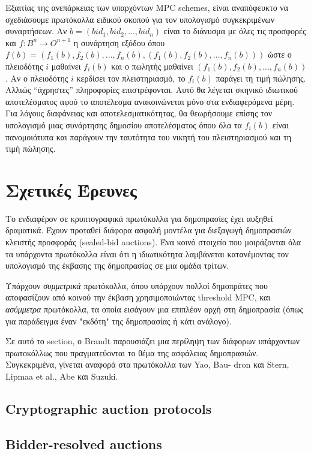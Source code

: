 \documentclass[letterpaper,11pt]{article}
\begin{document}
Εξαιτίας της ανεπάρκειας των υπαρχόντων MPC schemes, είναι αναπόφευκτο να σχεδιάσουμε πρωτόκολλα ειδικού
σκοπού για τον υπολογισμό συγκεκριμένων συναρτήσεων. Αν $b = (bid_1, bid_2, ..., bid_n)$ είναι το διάνυσμα με
όλες τις προσφορές και $f: B^n \rightarrow O^{n+1}$ η συνάρτηση εξόδου όπου $f(b) = (f_1(b), f_2(b), ...,
f_n(b),(f_1(b), f_2(b), ...,f_n(b)))$ ώστε ο πλειοδότης $i$ μαθαίνει $f_i(b)$ και ο πωλητής μαθαίνει $(f_1(b),
f_2(b), ..., f_n(b))$. Αν ο πλειοδότης $i$ κερδίσει τον πλειστηριασμό, το $f_i(b)$ παράγει τη τιμή πώλησης.
Αλλιώς “άχρηστες” πληροφορίες επιστρέφονται. Αυτό θα λέγεται σκηνικό ιδιωτικού αποτελέσματος αφού το
αποτέλεσμα ανακοινώνεται μόνο στα ενδιαφερόμενα μέρη. Για λόγους διαφάνειας και αποτελεσματικότητας, θα
θεωρήσουμε επίσης τον υπολογισμό μιας συνάρτησης δημοσίου αποτελέσματος όπου όλα τα $f_i(b)$ είναι
πανομοιότυπα και παράγουν την ταυτότητα του νικητή του πλειστηριασμού και τη τιμή πώλησης.

\section{Σχετικές Έρευνες} Το ενδιαφέρον σε κρυπτογραφικά πρωτόκολλα για δημοπρασίες έχει αυξηθεί δραματικά.
Έχουν προταθεί διάφορα ασφαλή μοντέλα για διεξαγωγή δημοπρασιών κλειστής προσφοράς (sealed-bid auctions). Ένα
κοινό στοιχείο που μοιράζονται όλα τα υπάρχοντα πρωτόκολλα είναι ότι η ιδιωτικότητα λαμβάνεται κατανέμοντας
τον υπολογισμό της έκβασης της δημοπρασίας σε μια ομάδα τρίτων.

Υπάρχουν \emph{συμμετρικά} πρωτόκολλα, όπου υπάρχουν πολλοί δημοπράτες που αποφασίζουν από κοινού την έκβαση
χρησιμοποιώντας threshold MPC, και \emph{ασύμμετρα} πρωτόκολλα, τα οποία εισάγουν μια επιπλέον αρχή στη
δημοπρασία (όπως για παράδειγμα έναν "εκδότη" της δημοπρασίας ή κάτι ανάλογο).

Σε αυτό το section, ο Brandt παρουσιάζει μια περίληψη των διάφορων υπάρχοντων πρωτοκόλλως που πραγματεύονται
το θέμα της ασφάλειας δημοπρασιών. Συγκεκριμένα, γίνεται αναφορά στα πρωτόκολλα των Yao, Bau- dron και Stern,
Lipmaa et al., Abe και Suzuki.

	\subsection{Cryptographic auction protocols}
	\subsection{Bidder-resolved auctions}
	
\end{document}
